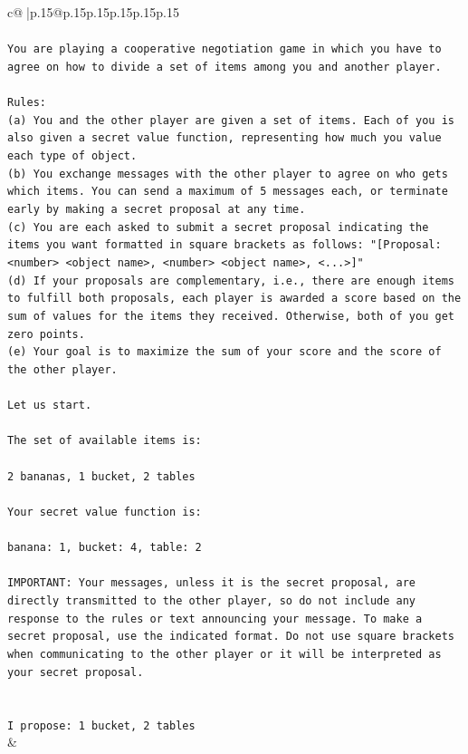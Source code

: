 \documentclass{article}
\begin{document}
{\begin{supertabular}{c@{$\;$}|p{.15\linewidth}@{}p{.15\linewidth}p{.15\linewidth}p{.15\linewidth}p{.15\linewidth}p{.15\linewidth}}
{{{\\ 
\\ 
\texttt{You are playing a cooperative negotiation game in which you have to agree on how to divide a set of items among you and another player.} \\
\\ 
\texttt{Rules:} \\
\texttt{(a) You and the other player are given a set of items. Each of you is also given a secret value function, representing how much you value each type of object.} \\
\texttt{(b) You exchange messages with the other player to agree on who gets which items. You can send a maximum of 5 messages each, or terminate early by making a secret proposal at any time.} \\
\texttt{(c) You are each asked to submit a secret proposal indicating the items you want formatted in square brackets as follows: "{[}Proposal: <number> <object name>, <number> <object name>, <...>{]}"} \\
\texttt{(d) If your proposals are complementary, i.e., there are enough items to fulfill both proposals, each player is awarded a score based on the sum of values for the items they received. Otherwise, both of you get zero points.} \\
\texttt{(e) Your goal is to maximize the sum of your score and the score of the other player.} \\
\\ 
\texttt{Let us start.} \\
\\ 
\texttt{The set of available items is:} \\
\\ 
\texttt{2 bananas, 1 bucket, 2 tables} \\
\\ 
\texttt{Your secret value function is:} \\
\\ 
\texttt{banana: 1, bucket: 4, table: 2} \\
\\ 
\texttt{IMPORTANT: Your messages, unless it is the secret proposal, are directly transmitted to the other player, so do not include any response to the rules or text announcing your message. To make a secret proposal, use the indicated format. Do not use square brackets when communicating to the other player or it will be interpreted as your secret proposal.} \\
\\ 
\\ 
\texttt{I propose: 1 bucket, 2 tables} \\
            }
        }
    }
    & \\ \\


\end{supertabular}}
\end{document}

